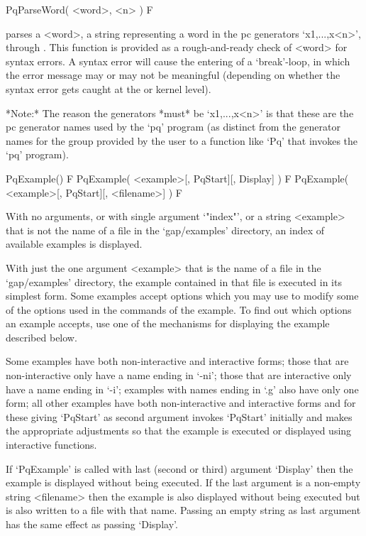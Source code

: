 \>PqParseWord( <word>, <n> ) F

parses a <word>, a string  representing  a  word  in  the  pc  generators
`x1,...,x<n>',  through  {\GAP}.  This  function   is   provided   as   a
rough-and-ready check of <word> for syntax errors. A  syntax  error  will
cause the entering of a `break'-loop, in which the error message  may  or
may not be meaningful (depending on whether the syntax error gets  caught
at the {\GAP} or kernel level).

*Note:*
The reason the generators *must* be `x1,...,x<n>' is that these  are  the
pc generator names used  by  the  `pq'  program  (as  distinct  from  the
generator names for the group provided by the user  to  a  function  like
`Pq' that invokes the `pq' program).

\>PqExample() F
\>PqExample( <example>[, PqStart][, Display] ) F
\>PqExample( <example>[, PqStart][, <filename>] ) F

With no arguments,  or  with  single  argument  `"index"',  or  a  string
<example> that is not the name of a file in the `gap/examples' directory,
an index of available examples is displayed.

With just the one argument <example> that is the name of a  file  in  the
`gap/examples' directory, the example contained in that file is  executed
in its simplest form. Some examples accept options which you may  use  to
modify some of the options used in the commands of the example.  To  find
out which options an example  accepts, use  one  of  the  mechanisms  for
displaying the example described below.

Some examples have both non-interactive and interactive forms; those that
are non-interactive only have a name ending  in  `-ni';  those  that  are
interactive only have a name ending in `-i'; examples with  names  ending
in  `.g'  also  have  only  one  form;  all  other  examples  have   both
non-interactive and interactive forms and for these giving  `PqStart'  as
second argument invokes `PqStart' initially  and  makes  the  appropriate
adjustments  so  that  the  example  is  executed  or   displayed   using
interactive functions.

If `PqExample' is called with last (second or third)  argument  `Display'
then the example  is  displayed  without  being  executed.  If  the  last
argument is a non-empty  string  <filename>  then  the  example  is  also
displayed without being executed but is also written to a file with  that
name. Passing an empty string as last argument has  the  same  effect  as
passing `Display'.

